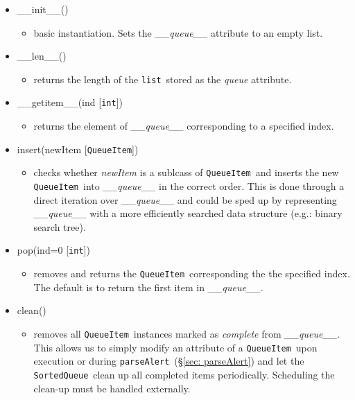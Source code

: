 \documentclass{article}
\newcommand{\parseAlert}{\texttt{parseAlert}}
\newcommand{\SortedQueue}{\texttt{SortedQueue}}
\newcommand{\QueueItem}{\texttt{QueueItem}}
\newcommand{\pythonint}{\texttt{int}}
\newcommand{\pythonlist}{\texttt{list}}
\begin{document}
\begin{itemize}
    \item{\_\_init\_\_()
        \begin{itemize}
            \item{basic instantiation. Sets the \textit{\_\_queue\_\_} attribute to an empty list.}
        \end{itemize}
         }
    \item{\_\_len\_\_()
        \begin{itemize}
            \item{returns the length of the \pythonlist~stored as the \textit{queue} attribute.}
        \end{itemize}
         }
    \item{\_\_getitem\_\_(ind [\pythonint])
        \begin{itemize}
            \item{returns the element of \textit{\_\_queue\_\_} corresponding to a specified index.}
        \end{itemize}
         }
    \item{insert(newItem [\QueueItem])
        \begin{itemize}
            \item{checks whether \textit{newItem} is a sublcass of \QueueItem~and inserts the new \QueueItem~into \textit{\_\_queue\_\_} in the correct order. This is done through a direct iteration over \textit{\_\_queue\_\_} and could be sped up by representing \textit{\_\_queue\_\_} with a more efficiently searched data structure (e.g.: binary search tree).}
        \end{itemize}
         }
    \item{pop(ind=0 [\pythonint])
        \begin{itemize}
            \item{removes and returns the \QueueItem~corresponding the the specified index. The default is to return the first item in \textit{\_\_queue\_\_}.}
        \end{itemize}
         }
    \item{clean()
        \begin{itemize}
            \item{removes all \QueueItem~instances marked as \textit{complete} from \textit{\_\_queue\_\_}. This allows us to simply modify an attribute of a \QueueItem~upon execution or during \parseAlert~(\S\ref{sec: parseAlert}) and let the \SortedQueue~clean up all completed items periodically. Scheduling the clean-up must be handled externally.}

\end{itemize}}
\end{itemize}
\end{document}
